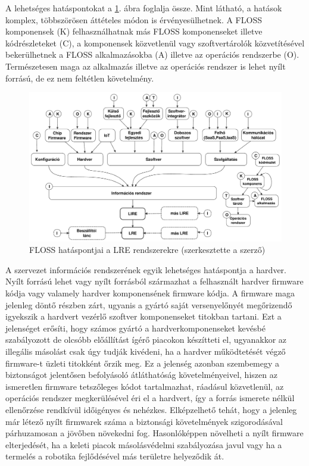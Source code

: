 \documentclass[12pt,magyar,a4paper,oneside]{scrreprt}
\begin{document}
A lehetséges hatáspontokat a \ref{fig:FLOSSHatuxe1s}. ábra foglalja
össze. Mint látható, a hatások komplex, többszörösen áttételes módon is
érvényesülhetnek. A FLOSS komponensek (K) felhasználhatnak más FLOSS
komponenseket illetve kódrészleteket (C), a komponensek közvetlenül vagy
szoftvertárolók közvetítésével bekerülhetnek a FLOSS alkalmazásokba (A)
illetve az operációs rendszerbe (O). Természetesen maga az alkalmazás
illetve az operációs rendszer is lehet nyílt forrású, de ez nem
feltétlen követelmény.

\begin{figure}
\hypertarget{fig:FLOSSHatuxe1s}{%
\centering
\includegraphics{ábrák/FLOSS_hatáspontjai.pdf}
\caption{FLOSS hatáspontjai a LRE rendszerekre (szerkesztette a
szerző)}\label{fig:FLOSSHatuxe1s}
}
\end{figure}

A szervezet információs rendszerének egyik lehetséges hatáspontja a
hardver. Nyílt forrású lehet vagy nyílt forrásból származhat a
felhasznált hardver firmware kódja vagy valamely hardver komponensének
firmware kódja. A firmware maga jelenleg döntő részben zárt, ugyanis a
gyártó saját versenyelőnyét megőrizendő igyekszik a hardvert vezérlő
szoftver komponenseket titokban tartani. Ezt a jelenséget erősíti, hogy
számos gyártó a hardverkomponenseket kevésbé szabályozott de olcsóbb
előállítást ígérő piacokon készítteti el, ugyanakkor az illegális
másolást csak úgy tudják kivédeni, ha a hardver működtetését végző
firmware-t üzleti titokként őrzik meg. Ez a jelenség azonban szembemegy
a biztonságot jelentősen befolyásoló átláthatóság követelményeivel,
hiszen az ismeretlen firmware tetszőleges kódot tartalmazhat, ráadásul
közvetlenül, az operációs rendszer megkerülésével éri el a hardvert, így
a forrás ismerete nélkül ellenőrzése rendkívül időigényes és nehézkes.
Elképzelhető tehát, hogy a jelenleg már létező nyílt firmwarek száma a
biztonsági követelmények szigorodásával párhuzamosan a jövőben növekedni
fog. Hasonlóképpen növelheti a nyílt firmware elterjedését, ha a keleti
piacok másolásvédelmi szabályozása javul vagy ha a termelés a robotika
fejlődésével más területre helyeződik át.
\end{document}

